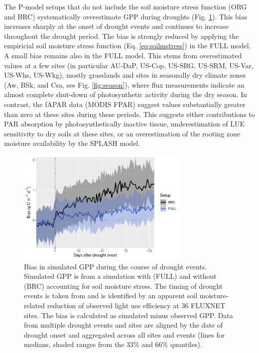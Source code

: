 \documentclass[gmd, manuscript]{copernicus}
\begin{document}
The P-model setups that do not include the soil moisture stress function (ORG and BRC) systematically overestimate GPP during droughts (Fig. \ref{fig:modobs_droughtresponse}). This bias increases sharply at the onset of drought events and continues to increase throughout the drought period. The bias is strongly reduced by applying the empiricial soil moisture stress function (Eq. \ref{eq:soilmstress}) in the FULL model. A small bias remains also in the FULL model. This stems from overestimated values at a few sites (in particular AU-DaP, US-Cop, US-SRG, US-SRM, US-Var, US-Whs, US-Wkg), mostly grasslands and sites in seasonally dry climate zones (Aw, BSk, and Csa, see Fig. \ref{fig:season}), where flux measurements indicate an almost complete shut-down of photosynthetic activity during the dry season. In contrast, the fAPAR data (MODIS FPAR) suggest values substantially greater than zero at these sites during these periods. This suggests either contributions to PAR absorption by photosynthetically inactive tissue, underestimation of LUE sensitivity to dry soils at these sites, or an overestimation of the rooting zone moisture availability by the SPLASH model.

\begin{figure}[t]
\includegraphics[width=8.3cm]{fig/droughtresponse.pdf}
    \caption{Bias in simulated GPP during the course of drought events. Simulated GPP is from a simulation with (FULL) and without (BRC) accounting for soil moisture stress. The timing of drought events is taken from \citet{stocker18newphyt} and is identified by an apparent soil moisture-related reduction of observed light use efficiency at 36 FLUXNET sites. The bias is calculated as simulated minus observed GPP. Data from multiple drought events and sites are aligned by the date of drought onset and aggregated across all sites and events (lines for medians, shaded ranges from the 33\% and 66\% quantiles).}
    \label{fig:modobs_droughtresponse}
\end{figure}
\end{document}
